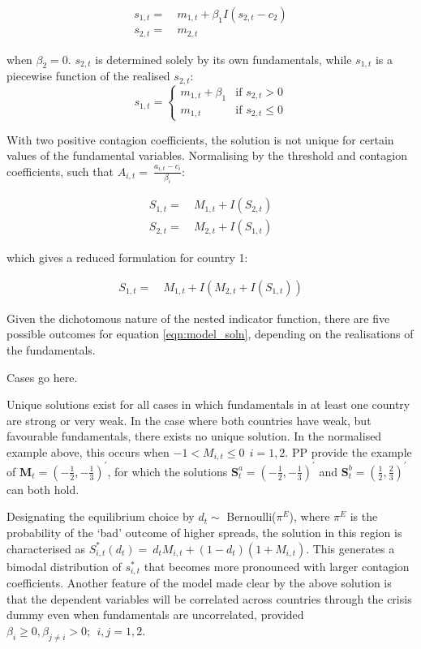 \documentclass[../base.tex]{subfiles}
\begin{document}
\begin{align*}
	s_{1,t} =&~ m_{1,t} + \beta_1 I(s_{2,t} - c_2) \\
	s_{2,t} =&~ m_{2,t}
\end{align*}

when $\beta_2 = 0$. $s_{2,t}$ is determined solely by its own fundamentals, while $s_{1,t}$ is a piecewise function of the realised $s_{2,t}$:
\[
s_{1,t} = 
\begin{cases} 
m_{1,t} + \beta_1  & \text{if } s_{2,t} > 0 \\
m_{1,t}		       & \text{if } s_{2,t} \leq 0
\end{cases}
\]

With two positive contagion coefficients, the solution is not unique for certain values of the fundamental variables. Normalising by the threshold and contagion coefficients, such that $A_{i,t} =~\frac{a_{i,t} - c_i}{\beta_i}$:

\begin{align*}
	S_{1,t} =&~ M_{1,t} + I(S_{2,t})\\
	S_{2,t} =&~ M_{2,t} + I(S_{1,t})
\end{align*}

which gives a reduced formulation for country 1:

\begin{align}
	S_{1,t} =&~ M_{1,t} + I(M_{2,t} + I(S_{1,t}))
	\label{eqn:model_soln}
\end{align}

Given the dichotomous nature of the nested indicator function, there are five possible outcomes for equation \ref{eqn:model_soln}, depending on the realisations of the fundamentals. 

Cases go here.

Unique solutions exist for all cases in which fundamentals in at least one country are strong or very weak. In the case where both countries have weak, but favourable fundamentals, there exists no unique solution. In the normalised example above, this occurs when $-1 < M_{i,t} \leq 0~~i = 1,2$. PP provide the example of $\mathbf{M}_t = (-\frac{1}{2}, -\frac{1}{3})^\prime$, for which the solutions $\mathbf{S}_t^a = (-\frac{1}{2}, -\frac{1}{3})^\prime$ and $\mathbf{S}_t^b = (\frac{1}{2}, \frac{2}{3})^\prime$ can both hold.


Designating the equilibrium choice by $d_t \sim$ Bernoulli($\pi^E$), where $\pi^E$ is the probability of the `bad' outcome of higher spreads, the solution in this region is characterised as $S_{i,t}^*(d_t) =~d_tM_{i,t} + (1 - d_t)(1 + M_{i,t})$. This generates a bimodal distribution of $s_{i,t}^*$ that becomes more pronounced with larger contagion coefficients. Another feature of the model made clear by the above solution is that the dependent variables will be correlated across countries through the crisis dummy even when fundamentals are uncorrelated, provided $\beta_i \geq 0, \beta_{j \neq i} > 0;~~ i,j = 1, 2$. 
\end{document}
